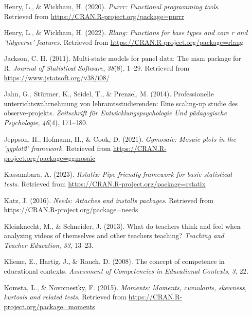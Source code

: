 \documentclass[
  man]{apa6}
\newlength{\cslhangindent}
\newenvironment{CSLReferences}[2] %
 {\begin{list}{}{%
  \setlength{\itemindent}{0pt}
  \setlength{\leftmargin}{0pt}
  \setlength{\parsep}{0pt}
  \ifodd #1
   \setlength{\leftmargin}{\cslhangindent}
   \setlength{\itemindent}{-1\cslhangindent}
  \fi
  \setlength{\itemsep}{#2\baselineskip}}}
 {\end{list}}
\begin{document}
\begin{CSLReferences}{1}{0}
Henry, L., \& Wickham, H. (2020). \emph{Purrr: Functional programming tools}. Retrieved from \url{https://CRAN.R-project.org/package=purrr}

Henry, L., \& Wickham, H. (2022). \emph{Rlang: Functions for base types and core r and 'tidyverse' features}. Retrieved from \url{https://CRAN.R-project.org/package=rlang}

Jackson, C. H. (2011). Multi-state models for panel data: The {msm} package for {R}. \emph{Journal of Statistical Software}, \emph{38}(8), 1--29. Retrieved from \url{https://www.jstatsoft.org/v38/i08/}

Jahn, G., Stürmer, K., Seidel, T., \& Prenzel, M. (2014). Professionelle unterrichtswahrnehmung von lehramtsstudierenden: Eine scaling-up studie des observe-projekts. \emph{Zeitschrift f{ü}r Entwicklungspsychologie Und p{ä}dagogische Psychologie}, \emph{46}(4), 171--180.

Jeppson, H., Hofmann, H., \& Cook, D. (2021). \emph{Ggmosaic: Mosaic plots in the 'ggplot2' framework}. Retrieved from \url{https://CRAN.R-project.org/package=ggmosaic}

Kassambara, A. (2023). \emph{Rstatix: Pipe-friendly framework for basic statistical tests}. Retrieved from \url{https://CRAN.R-project.org/package=rstatix}

Katz, J. (2016). \emph{Needs: Attaches and installs packages}. Retrieved from \url{https://CRAN.R-project.org/package=needs}

Kleinknecht, M., \& Schneider, J. (2013). What do teachers think and feel when analyzing videos of themselves and other teachers teaching? \emph{Teaching and Teacher Education}, \emph{33}, 13--23.

Klieme, E., Hartig, J., \& Rauch, D. (2008). The concept of competence in educational contexts. \emph{Assessment of Competencies in Educational Contexts}, \emph{3}, 22.

Komsta, L., \& Novomestky, F. (2015). \emph{Moments: Moments, cumulants, skewness, kurtosis and related tests}. Retrieved from \url{https://CRAN.R-project.org/package=moments}


\end{CSLReferences}
\end{document}
